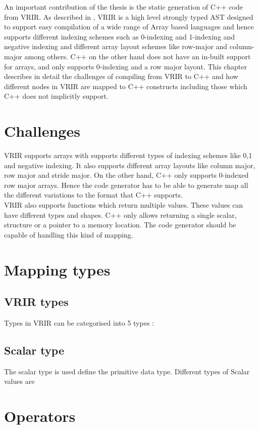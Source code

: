 An important contribution of the thesis is the static generation of C++ code from VRIR. As described in , VRIR is a high level strongly typed AST designed to support easy compilation of a wide range of Array based languages and hence supports different indexing schemes such as 0-indexing and 1-indexing and negative indexing and different array layout schemes like row-major and column-major  among others. C++ on the other hand does not have an in-built support for arrays, and only supports 0-indexing and a row major layout. This chapter describes in detail the challenges of compiling from VRIR to C++ and  how different nodes in VRIR are mapped to C++ constructs including those which C++ does not implicitly support.
\section{Challenges}
VRIR supports arrays with supports different types of indexing schemes like 0,1 and negative indexing. It also supports different array layouts like column major, row major and stride major. On the other hand, C++ only supports 0-indexed row major arrays. Hence the code generator has to be able to generate map all the different variations to the format that C++ supports.\\ %
VRIR also supports functions which return multiple values. These values can have different types and shapes. C++ only allows returning a single scalar, structure or a pointer to a memory location. The code generator should be capable of handling this kind of mapping. \\
\section{Mapping types}
\subsection{VRIR types}
Types in VRIR can be categorised into 5 types :
\subsection{Scalar type}
The scalar type is used define the primitive data type.
Different types of Scalar values are 
\section{Operators}
